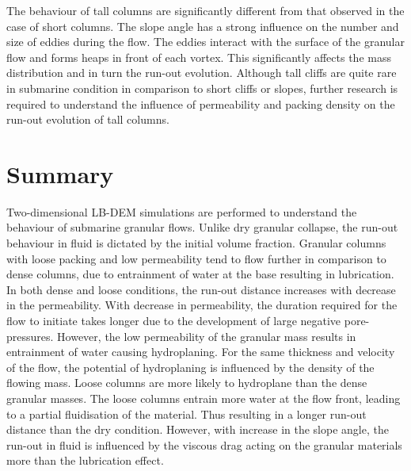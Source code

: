 The behaviour of tall columns are significantly different from that observed in 
the case of short columns. The slope angle has a strong influence on the number 
and size of eddies during the flow. The eddies interact with the surface of the 
granular flow and forms heaps in front of each vortex. This significantly 
affects the mass distribution and in turn the run-out evolution. Although tall 
cliffs are quite rare in submarine condition in comparison to short cliffs or 
slopes, further research is required to understand the influence of 
permeability and packing density on the run-out evolution of tall columns. 

\section{Summary}

Two-dimensional LB-DEM simulations are performed to understand the behaviour 
of submarine granular flows. Unlike dry granular collapse, the run-out 
behaviour in fluid is dictated by the initial volume fraction. Granular columns 
with loose packing and low permeability tend to flow further in comparison to 
dense columns, due to entrainment of water at the base resulting in 
lubrication. In both dense and loose conditions, the run-out distance increases 
with decrease in the permeability. With decrease in permeability, the duration 
required for the flow to initiate takes longer due to the development of large 
negative pore-pressures. However, the low permeability of the granular mass 
results in entrainment of water causing hydroplaning. For the same 
thickness and velocity of the flow, the potential of hydroplaning is influenced 
by the density of the flowing mass. Loose columns are more likely to hydroplane 
than the dense granular masses. The loose columns entrain more water 
at the flow front, leading to a partial fluidisation of the material. Thus 
resulting in a longer run-out distance than the dry condition. However, 
with increase in the slope angle, the run-out in fluid is influenced by the 
viscous drag acting on the granular materials more than the lubrication effect. 
